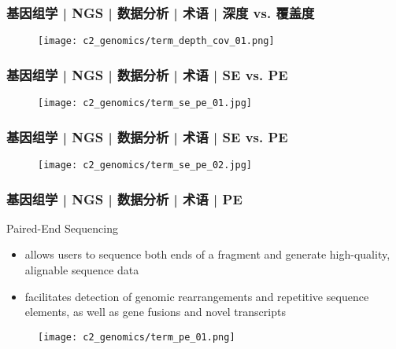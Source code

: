 \begin{frame}
  \frametitle{基因组学 | NGS | 数据分析 | 术语 | 深度 vs. 覆盖度}
  \begin{figure}
    \centering
    \texttt{[image: c2\_genomics/term\_depth\_cov\_01.png]}
  \end{figure}
\end{frame}

\begin{frame}
  \frametitle{基因组学 | NGS | 数据分析 | 术语 | SE vs. PE}
  \begin{figure}
    \centering
    \texttt{[image: c2\_genomics/term\_se\_pe\_01.jpg]}
  \end{figure}
\end{frame}

\begin{frame}
  \frametitle{基因组学 | NGS | 数据分析 | 术语 | SE vs. PE}
  \begin{figure}
    \centering
    \texttt{[image: c2\_genomics/term\_se\_pe\_02.jpg]}
  \end{figure}
\end{frame}

\begin{frame}
  \frametitle{基因组学 | NGS | 数据分析 | 术语 | PE}
  \begin{block}{Paired-End Sequencing}
    \begin{itemize}
      \item allows users to sequence both ends of a fragment and generate high-quality, alignable sequence data
      \item facilitates detection of genomic rearrangements and repetitive sequence elements, as well as gene fusions and novel transcripts
    \end{itemize}
  \end{block}
  \begin{figure}
    \centering
    \texttt{[image: c2\_genomics/term\_pe\_01.png]}
  \end{figure}
\end{frame}

